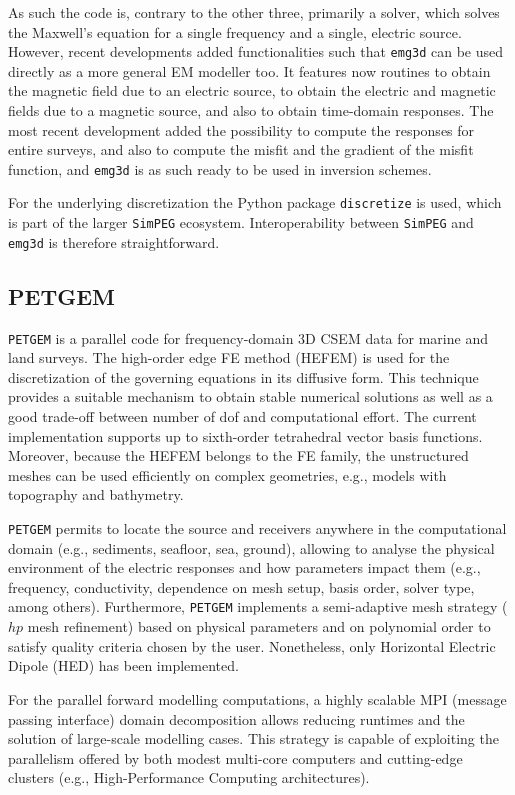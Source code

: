 \documentclass[
    paper,
  ]{geophysics}
\newcommand{\emg}[2]{\texttt{emg#1#2}\xspace}
\newcommand{\simpeg}{\texttt{SimPEG}\xspace}
\newcommand{\discretize}{\texttt{discretize}\xspace}
\newcommand{\petgem}{\texttt{PETGEM}\xspace}
\begin{document}
As such the code is, contrary to the other three, primarily a solver, which solves the Maxwell's equation for a single frequency and a single, electric source. However, recent developments added functionalities such that \emg3d can be used directly as a more general EM modeller too. It features now routines to obtain the magnetic field due to an electric source, to obtain the electric and magnetic fields due to a magnetic source, and also to obtain time-domain responses. The most recent development added the possibility to compute the responses for entire surveys, and also to compute the misfit and the gradient of the misfit function, and \emg3d is as such ready to be used in inversion schemes.

For the underlying discretization the Python package \discretize is used, which is part of the larger \simpeg ecosystem. Interoperability between \simpeg and \emg3d is therefore straightforward.

\subsection{PETGEM}

\petgem is a parallel code for frequency-domain 3D CSEM data for marine and land surveys. The high-order edge FE method (HEFEM) is used for the discretization of the governing equations in its diffusive form. This technique provides a suitable mechanism to obtain stable numerical solutions as well as a good trade-off between number of dof and computational effort. The current implementation supports up to sixth-order tetrahedral vector basis functions. Moreover, because the HEFEM belongs to the FE family, the unstructured meshes can be used efficiently on complex geometries, e.g., models with topography and bathymetry.

\petgem permits to locate the source and receivers anywhere in the computational domain (e.g., sediments, seafloor, sea, ground), allowing to analyse the physical environment of the electric responses and how parameters impact them (e.g., frequency, conductivity, dependence on mesh setup, basis order, solver type, among others). Furthermore, \petgem implements a semi-adaptive mesh strategy ($hp$ mesh refinement) based on physical parameters and on polynomial order to satisfy quality criteria chosen by the user. Nonetheless, only Horizontal Electric Dipole (HED) has been implemented.

For the parallel forward modelling computations, a highly scalable MPI (message passing interface) domain decomposition allows reducing runtimes and the solution of large-scale modelling cases. This strategy is capable of exploiting the parallelism offered by both modest multi-core computers and cutting-edge clusters (e.g., High-Performance Computing architectures).
\end{document}
